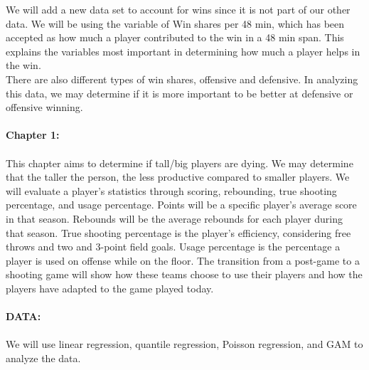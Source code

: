 \documentclass[11pt,letterpaper]{amsart}
\begin{document}
\noindent We will add a new data set to account for wins since it is not part of our other data. We will be using the variable of Win shares per 48 min, which has been accepted as how much a player contributed to the win in a 48 min span. This explains the variables most important in determining how much a player helps in the win.\\

\noindent There are also different types of win shares, offensive and defensive.  In analyzing this data, we may determine if it is more important to be better at defensive or offensive winning.
\\\\
\textbf{Chapter 1:}\\\\
\indent This chapter aims to determine if tall/big players are dying. We may determine that the taller the person, the less productive compared to smaller players. We will evaluate a player’s statistics through scoring, rebounding, true shooting percentage, and usage percentage. Points will be a specific player’s average score in that season. Rebounds will be the average rebounds for each player during that season. True shooting percentage is the player’s efficiency, considering free throws and two and 3-point field goals. Usage percentage is the percentage a player is used on offense while on the floor. The transition from a post-game to a shooting game will show how these teams choose to use their players and how the players have adapted to the game played today.\\
\cite{1} \leavevmode \newline\\
\noindent \textbf{{\large DATA:}} \\\\
\indent We will use linear regression, quantile regression, Poisson regression, and GAM to analyze the data.\\
\end{document}
